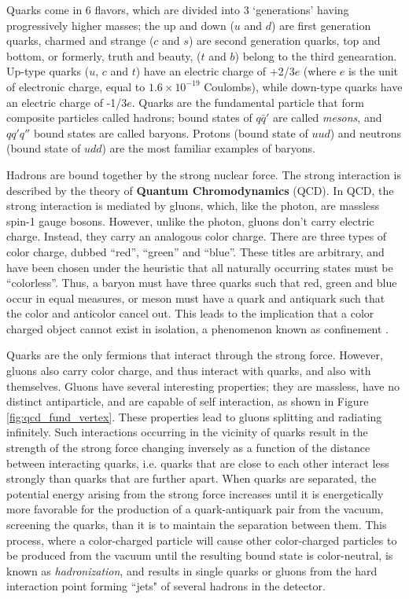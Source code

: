 \documentclass[12pt,a4paper,openright,twoside]{report}
\begin{document}
Quarks come in 6 flavors, which are divided into 3 `generations' having progressively higher masses; the up and down ($u$ and $d$) are first generation quarks, charmed and strange ($c$ and $s$) are second generation quarks, top and bottom, or formerly, truth and beauty, ($t$ and $b$) belong to the third genearation. Up-type quarks ($u$, $c$ and $t$) have an electric charge of +2/3$e$ (where $e$ is the unit of electronic charge, equal to $1.6\times 10^{-19}$ Coulombs), while down-type quarks have an electric charge of -1/3$e$. Quarks are the fundamental particle that form composite particles called hadrons; bound states of $q\bar{q}'$ are called \textit{mesons}, and $qq'q''$ bound states are called baryons. Protons (bound state of $uud$) and neutrons (bound state of $udd$) are the most familiar examples of baryons.

Hadrons are bound together by the strong nuclear force. The strong interaction is described by the theory of \textbf{Quantum Chromodynamics} (QCD). In QCD, the strong interaction is mediated by gluons, which, like the photon, are massless spin-1 gauge bosons. However, unlike the photon, gluons don't carry electric charge. Instead, they carry an analogous color charge. There are three types of color charge, dubbed ``red'', ``green'' and ``blue''. These titles are arbitrary, and have been chosen under the heuristic that all naturally occurring states must be ``colorless''. Thus, a baryon must have three quarks such that red, green and blue occur in equal measures, or meson must have a quark and antiquark such that the color and anticolor cancel out. This leads to the implication that a color charged object cannot exist in isolation, a phenomenon known as confinement \cite{confinement}.

Quarks are the only fermions that interact through the strong force. However, gluons also carry color charge, and thus interact with quarks, and also with themselves. Gluons have several interesting properties; they are massless, have no distinct antiparticle, and are capable of self interaction, as shown in Figure \ref{fig:qcd_fund_vertex}. These properties lead to gluons splitting and radiating infinitely. Such interactions occurring in the vicinity of quarks result in the strength of the strong force changing inversely as a function of the distance between interacting quarks, i.e. quarks that are close to each other interact less strongly than quarks that are further apart. When quarks are separated, the potential energy arising from the strong force increases until it is energetically more favorable for the production of a quark-antiquark pair from the vacuum, screening the quarks, than it is to maintain the separation between them. This process, where a color-charged particle will cause other color-charged particles to be produced from the vacuum until the resulting bound state is color-neutral, is known as \textit{hadronization}, and results in single quarks or gluons from the hard interaction point forming ``jets" of several hadrons in the detector.
\end{document}
